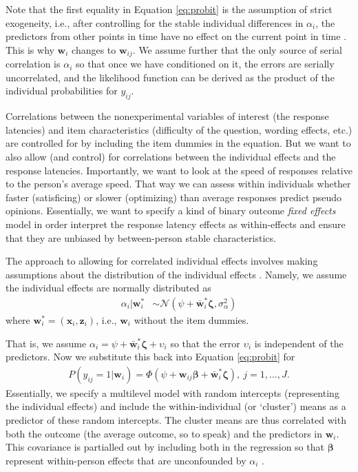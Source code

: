 \documentclass[Royal,times,sageh]{sagej}
\begin{document}
Note that the first equality in Equation \eqref{eq:probit} is the
assumption of strict exogeneity, i.e., after controlling for the stable
individual differences in \(\alpha_{i}\), the predictors from other
points in time have no effect on the current point in time
\citep[p.~483]{Wooldridge2002}. This is why \(\bm{w}_{i}\) changes to
\(\bm{w}_{ij}\). We assume further that the only source of serial
correlation is \(\alpha_{i}\) so that once we have conditioned on it,
the errors are serially uncorrelated, and the likelihood function can be
derived as the product of the individual probabilities for \(y_{ij}\).

Correlations between the nonexperimental variables of interest (the
response latencies) and item characteristics (difficulty of the
question, wording effects, etc.) are controlled for by including the
item dummies in the equation. But we want to also allow (and control)
for correlations between the individual effects and the response
latencies. Importantly, we want to look at the speed of responses
relative to the person's average speed. That way we can assess within
individuals whether faster (satisficing) or slower (optimizing) than
average responses predict pseudo opinions. Essentially, we want to
specify a kind of binary outcome \textit{fixed effects} model in order
interpret the response latency effects as within-effects and ensure that
they are unbiased by between-person stable characteristics.

The \citet{Mundlak1978} approach to allowing for correlated individual
effects involves making assumptions about the distribution of the
individual effects \citep[p.~487]{Wooldridge2002}. Namely, we assume the
individual effects are normally distributed as \begin{align}
\alpha_{i} | \bm{w}^{*}_{i} & \sim \mathcal{N}(\psi + \bar{\bm{w}}^{*}_{i}\bm{\zeta}, \sigma^{2}_{\alpha})
\end{align} where \(\bm{w}^{*}_{i} = (\bm{x}_{i},\bm{z}_{i})\), i.e.,
\(\bm{w}_{i}\) without the item dummies.

That is, we assume
\(\alpha_{i} = \psi + \bar{\bm{w}}^{*}_{i}\bm{\zeta} + \upsilon_{i}\) so
that the error \(\upsilon_{i}\) is independent of the predictors. Now we
substitute this back into Equation \eqref{eq:probit} for \begin{align}
P(y_{ij} = 1| \bm{w}_{i}) = \Phi(\psi + \bm{w}_{ij}\bm{\beta} + \bar{\bm{w}}^{*}_{i}\bm{\zeta}), \ j = 1, \ldots, J.
\end{align} Essentially, we specify a multilevel model with random
intercepts (representing the individual effects) and include the
within-individual (or `cluster') means as a predictor of these random
intercepts. The cluster means are thus correlated with both the outcome
(the average outcome, so to speak) and the predictors in \(\bm{w}_{i}\).
This covariance is partialled out by including both in the regression so
that \(\bm{\beta}\) represent within-person effects that are
unconfounded by \(\alpha_{i}\)
\citep{Ruettenauer2019b, Hamaker2019, Wooldridge2002, Mundlak1978, Schunck2017}.
\end{document}
